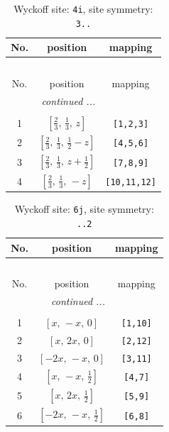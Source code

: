 \documentclass[fleqn,8pt]{jsarticle}
\begin{document}
\renewcommand{\arraystretch}{1.2}
\begin{longtable}{ccc}
\caption{Wyckoff site: {\tt 4i}, site symmetry: {\tt 3..}}
 \\
 \hline \hline
No. & position & mapping \\ \hline \endfirsthead

\multicolumn{2}{l}{\tablename\ \thetable{}} \\
 \hline \hline
No. & position & mapping \\ \hline \endhead

 \hline \hline
\multicolumn{2}{r}{\footnotesize\it continued ...} \\ \endfoot

 \hline \hline
\multicolumn{2}{r}{} \\ \endlastfoot

1 & $\left[ \frac{2}{3},\, \frac{1}{3},\, z \right]$ & {\tt [1,2,3]} \\ \hline
2 & $\left[ \frac{2}{3},\, \frac{1}{3},\, \frac{1}{2} - z \right]$ & {\tt [4,5,6]} \\ \hline
3 & $\left[ \frac{2}{3},\, \frac{1}{3},\, z + \frac{1}{2} \right]$ & {\tt [7,8,9]} \\ \hline
4 & $\left[ \frac{2}{3},\, \frac{1}{3},\, - z \right]$ & {\tt [10,11,12]} \\
\end{longtable}
\renewcommand{\arraystretch}{1.2}
\begin{longtable}{ccc}
\caption{Wyckoff site: {\tt 6j}, site symmetry: {\tt ..2}}
 \\
 \hline \hline
No. & position & mapping \\ \hline \endfirsthead

\multicolumn{2}{l}{\tablename\ \thetable{}} \\
 \hline \hline
No. & position & mapping \\ \hline \endhead

 \hline \hline
\multicolumn{2}{r}{\footnotesize\it continued ...} \\ \endfoot

 \hline \hline
\multicolumn{2}{r}{} \\ \endlastfoot

1 & $\left[ x,\, - x,\, 0 \right]$ & {\tt [1,10]} \\ \hline
2 & $\left[ x,\, 2 x,\, 0 \right]$ & {\tt [2,12]} \\ \hline
3 & $\left[ - 2 x,\, - x,\, 0 \right]$ & {\tt [3,11]} \\ \hline
4 & $\left[ x,\, - x,\, \frac{1}{2} \right]$ & {\tt [4,7]} \\ \hline
5 & $\left[ x,\, 2 x,\, \frac{1}{2} \right]$ & {\tt [5,9]} \\ \hline
6 & $\left[ - 2 x,\, - x,\, \frac{1}{2} \right]$ & {\tt [6,8]} \\
\end{longtable}
\end{document}
